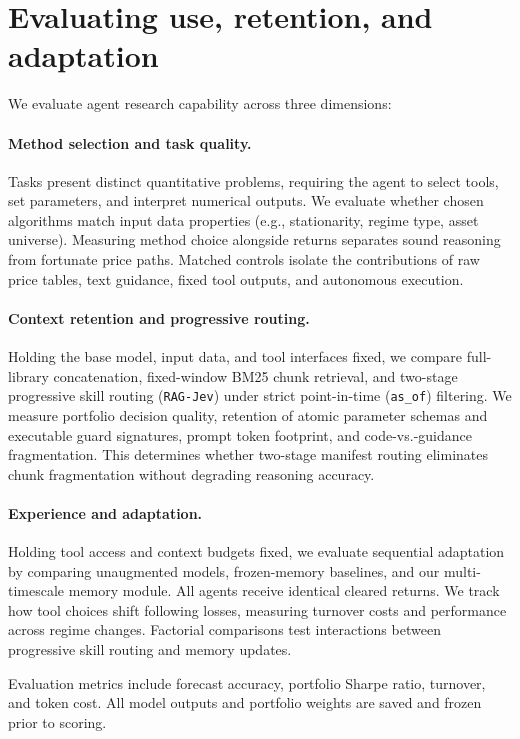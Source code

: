 \section{Evaluating use, retention, and adaptation}
\label{sec:capability_eval}
We evaluate agent research capability across three dimensions:

\paragraph{Method selection and task quality.}
Tasks present distinct quantitative problems, requiring the agent to select tools,
set parameters, and interpret numerical outputs. We evaluate whether chosen algorithms
match input data properties (e.g., stationarity, regime type, asset universe).
Measuring method choice alongside returns separates sound reasoning from fortunate
price paths. Matched controls isolate the contributions of raw price tables, text
guidance, fixed tool outputs, and autonomous execution.

\paragraph{Context retention and progressive routing.}
Holding the base model, input data, and tool interfaces fixed, we compare full-library
concatenation, fixed-window BM25 chunk retrieval, and two-stage progressive skill routing
(\texttt{RAG-Jev}) under strict point-in-time (\texttt{as\_of}) filtering. We measure portfolio decision
quality, retention of atomic parameter schemas and executable guard signatures, prompt token
footprint, and code-vs.-guidance fragmentation. This determines whether two-stage manifest routing
eliminates chunk fragmentation without degrading reasoning accuracy.

\paragraph{Experience and adaptation.}
Holding tool access and context budgets fixed, we evaluate sequential adaptation by
comparing unaugmented models, frozen-memory baselines, and our multi-timescale memory
module. All agents receive identical cleared returns. We track how tool choices shift
following losses, measuring turnover costs and performance across regime changes.
Factorial comparisons test interactions between progressive skill routing and memory updates.

Evaluation metrics include forecast accuracy, portfolio Sharpe ratio, turnover, and
token cost. All model outputs and portfolio weights are saved and frozen prior to
scoring.
